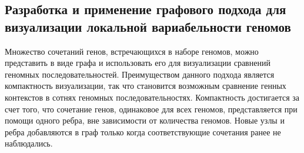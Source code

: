 \begin{table}[htbp]
\centering
\caption{Список оперонов статистически значимо пере-представленных в группе штаммов \textit{E. coli} изолированных от пациентов с болезнью Крона. N - количество генов, Pobs - наблюдаемая доля перепредставленных генов в опероне, Pmean - средняя доля перепредставленных генов при случайных пермутациях, Pmax - максимальная доля перепредставленных генов при случайных пермутациях.}
\label{tbl:ops1}
\setlength{\fboxsep}{10pt}%
\setlength{\fboxrule}{0pt}%
\end{table}



\subsection*{Разработка и применение графового подхода для визуализации локальной вариабельности геномов}

Множество сочетаний генов, встречающихся в наборе геномов, можно представить в виде графа и использовать его для визуализации сравнений геномных последовательностей. Преимуществом данного подхода является компактность визуализации, так что становится возможным сравнение генных контекстов в сотнях геномных последовательностях. Компактность достигается за счет того, что сочетание генов, одинаковое для всех геномов, представляется при помощи одного ребра, вне зависимости от количества геномов. Новые узлы и ребра добавляются в граф только когда соответствующие сочетания ранее не наблюдались. 

